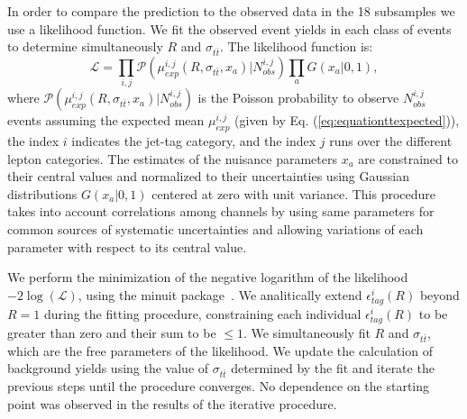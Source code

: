 \documentclass[aps,prd,twocolumn,superscriptaddress,showpacs]{revtex4}
\begin{document}
In order to compare the prediction to the observed data in the 18 subsamples we use a 
likelihood function. We fit the observed event yields in each class of events to determine 
simultaneously $R$ and $\sigma_{t\bar t}$.
The likelihood function is:
\begin{equation}
\mathcal{L}=\prod_{i,j}\mathscr{P}\left(\mu^{i,j}_{exp}(R,\sigma_{t\bar t},x_{a})|N^{i,j}_{obs}\right)\prod_{a}G\left(x_{a}|0,1\right),
\end{equation}  
where $\mathscr{P}\left(\mu^{i,j}_{exp}(R,\sigma_{t\bar t},x_{a})|N^{i,j}_{obs}\right)$ is the Poisson probability to observe 
$N^{i,j}_{obs}$ events assuming the expected mean $\mu_{exp}^{i,j}$  (given by Eq. (\ref{eq:equationttexpected})), 
the index  $i$  indicates the jet-tag category, and the index  $j$ runs over the different lepton categories.
The estimates of the nuisance parameters $x_{a}$ are constrained to their central values and normalized to their 
uncertainties using Gaussian distributions  $G\left(x_{a}|0,1\right)$ centered at zero with unit variance.
This procedure takes into account correlations among channels by using same parameters for  
common sources of systematic uncertainties and allowing variations of each parameter  with respect to its central value. 

We perform the minimization of 
the negative logarithm of the likelihood $-2\log\left(\mathcal{L}\right)$, 
using the {\sc minuit} package~\cite{minuit}. We analitically extend $\epsilon^i_{tag}(R)$ beyond $R=1$ during the fitting procedure, 
constraining each individual $\epsilon^i_{tag}(R)$ to be greater than zero and their sum  to be $\leq 1$.
We simultaneously fit  $R$ and $\sigma_{t\bar t}$, which are the free parameters of the likelihood. 
We update the calculation of background yields using the value of $\sigma_{t\bar{t}}$ determined by the fit
and iterate the previous steps until the procedure converges.
No dependence on the starting point was observed in the results of the iterative procedure.
\end{document}
